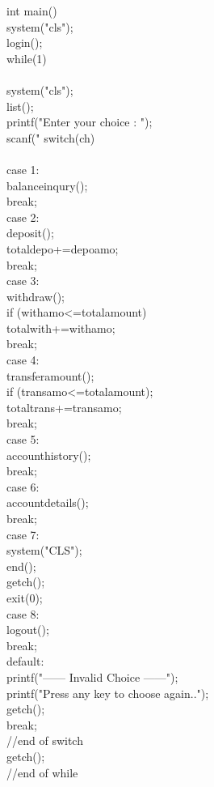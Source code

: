 \documentclass[12pt,a4 paper]{article}
\begin{document}
int main()\\
{
 system("cls");\\
 login();\\
 while(1)\\
 {\\
   system("cls");\\
   list();\\
   printf("Enter your choice : ");\\
   scanf("%
   switch(ch)\\
   {\\
   	 case 1:\\
     	balanceinqury();\\
     	break;\\
     case 2:\\
        deposit();\\
        totaldepo+=depoamo;\\
        break;\\
     case 3:\\
        withdraw();\\
        if (withamo<=totalamount)\\
            totalwith+=withamo;\\
        break;\\
     case 4:\\
        transferamount();\\
        if (transamo<=totalamount);\\
            totaltrans+=transamo;\\
        break;\\
     case 5:\\
     	accounthistory();\\
     	break;\\
     case 6:\\
        accountdetails();\\
        break;\\
     case 7:\\
        system("CLS");\\
        end();\\
        getch();\\
        exit(0);\\
     case 8:\\
     	logout();\\
     	break;\\
        
     default:\\
        printf("------ Invalid Choice ------");\\
        printf("Press any key to choose again..");\\
        getch();\\
        break;\\
    }//end of switch\\
   getch();\\
  }//end of while\\
}\\
\end{document}
